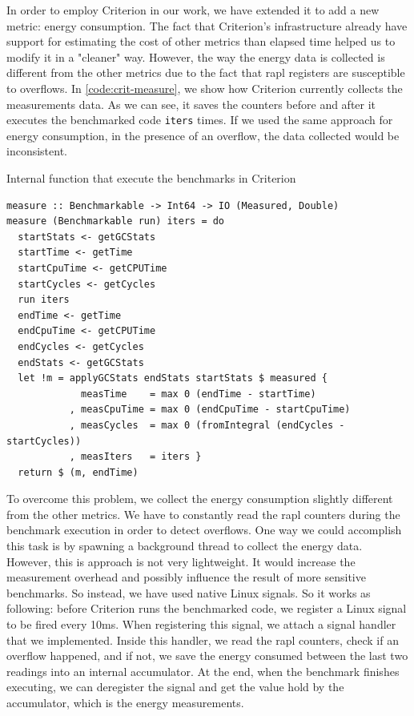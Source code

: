 In order to employ Criterion in our work, we have extended it to add a new metric: energy consumption. The fact that Criterion's infrastructure already have support for estimating the cost of other metrics than elapsed time helped us to modify it in a "cleaner" way. However, the way the energy data is collected is different from the other metrics due to the fact that \ac{rapl} registers are susceptible to overflows. In \autoref{code:crit-measure}, we show how Criterion currently collects the measurements data. As we can see, it saves the counters before and after it executes the benchmarked code \texttt{iters} times. If we used the same approach for energy consumption, in the presence of an overflow, the data collected would be inconsistent.

\begin{listing}
  \caption{Internal function that execute the benchmarks in Criterion}
  \begin{verbatim}
measure :: Benchmarkable -> Int64 -> IO (Measured, Double)
measure (Benchmarkable run) iters = do
  startStats <- getGCStats
  startTime <- getTime
  startCpuTime <- getCPUTime
  startCycles <- getCycles
  run iters
  endTime <- getTime
  endCpuTime <- getCPUTime
  endCycles <- getCycles
  endStats <- getGCStats
  let !m = applyGCStats endStats startStats $ measured {
             measTime    = max 0 (endTime - startTime)
           , measCpuTime = max 0 (endCpuTime - startCpuTime)
           , measCycles  = max 0 (fromIntegral (endCycles - startCycles))
           , measIters   = iters }
  return $ (m, endTime)
  \end{verbatim}
  \label{code:crit-measure}
\end{listing}

To overcome this problem, we collect the energy consumption slightly different from the other metrics. We have to constantly read the \ac{rapl} counters during the benchmark execution in order to detect overflows. One way we could accomplish this task is by spawning a background thread to collect the energy data. However, this is approach is not very lightweight. It would increase the measurement overhead and possibly influence the result of more sensitive benchmarks. So instead, we have used native Linux signals. So it works as following: before Criterion runs the benchmarked code, we register a Linux signal to be fired every 10ms. When registering this signal, we attach a signal handler that we implemented. Inside this handler, we read the \ac{rapl} counters, check if an overflow happened, and if not, we save the energy consumed between the last two readings into an internal accumulator. At the end, when the benchmark finishes executing, we can deregister the signal and get the value hold by the accumulator, which is the energy measurements.

